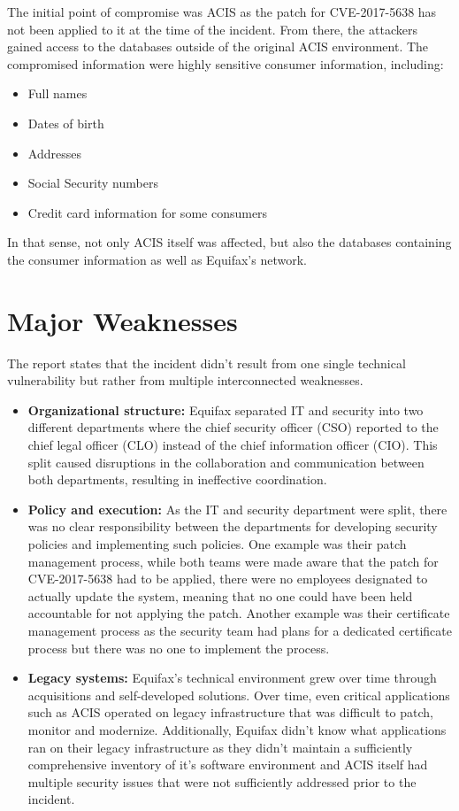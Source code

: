 The initial point of compromise was ACIS as the patch for CVE-2017-5638 has not been applied to it at the time of the incident. From there, the attackers gained access to the databases outside of the original ACIS environment.
\newline
The compromised information were highly sensitive consumer information, including:
\begin{itemize}
\item Full names
\item Dates of birth
\item Addresses
\item Social Security numbers
\item Credit card information for some consumers
\end{itemize}
In that sense, not only ACIS itself was affected, but also the databases containing the consumer information as well as Equifax's network.

\section{Major Weaknesses}

The report states that the incident didn't result from one single technical vulnerability but rather from multiple interconnected weaknesses.
\begin{itemize}
\item \textbf{Organizational structure:} Equifax separated IT and security into two different departments where the chief security officer (CSO) reported to the chief legal officer (CLO) instead of the chief information officer (CIO). This split caused disruptions in the collaboration and communication between both departments, resulting in ineffective coordination.
\item \textbf{Policy and execution:} As the IT and security department were split, there was no clear responsibility between the departments for developing security policies and implementing such policies. One example was their patch management process, while both teams were made aware that the patch for CVE-2017-5638 had to be applied, there were no employees designated to actually update the system, meaning that no one could have been held accountable for not applying the patch. Another example was their certificate management process as the security team had plans for a dedicated certificate process but there was no one to implement the process.
\item \textbf{Legacy systems:} Equifax's technical environment grew over time through acquisitions and self-developed solutions. Over time, even critical applications such as ACIS operated on legacy infrastructure that was difficult to patch, monitor and modernize. Additionally, Equifax didn't know what applications ran on their legacy infrastructure as they didn't maintain a sufficiently comprehensive inventory of it's software environment and ACIS itself had multiple security issues that were not sufficiently addressed prior to the incident.
\end{itemize}

